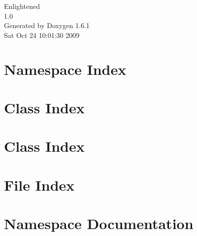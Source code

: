 \documentclass[a4paper]{book}
\begin{document}
\hypersetup{pageanchor=false}
\begin{titlepage}
\vspace*{7cm}
\begin{center}
{\Large Enlightened \\[1ex]\large 1.0 }\\
\vspace*{1cm}
{\large Generated by Doxygen 1.6.1}\\
\vspace*{0.5cm}
{\small Sat Oct 24 10:01:30 2009}\\
\end{center}
\end{titlepage}
\clearemptydoublepage
{}
\tableofcontents
\clearemptydoublepage
{}
\hypersetup{pageanchor=true}
\chapter{Namespace Index}

\chapter{Class Index}

\chapter{Class Index}

\chapter{File Index}

\chapter{Namespace Documentation}

\end{document}
